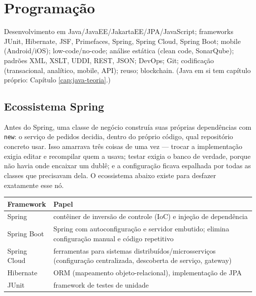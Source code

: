 \chapter{Programação}
\label{cap:programacao-teoria}

\begin{edital}
Desenvolvimento em Java/JavaEE/JakartaEE/JPA/JavaScript; frameworks JUnit,
Hibernate, JSF, Primefaces, Spring, Spring Cloud, Spring Boot; mobile
(Android/iOS); low-code/no-code; análise estática (clean code, SonarQube);
padrões XML, XSLT, UDDI, REST, JSON; DevOps; Git; codificação (transacional,
analítico, mobile, API); reuso; blockchain. (Java em si tem capítulo
próprio: Capítulo \ref{cap:java-teoria}.)
\end{edital}

\section{Ecossistema Spring}

\begin{conceito}
Antes do Spring, uma classe de negócio construía suas próprias
dependências com \texttt{new}: o serviço de pedidos decidia, dentro do
próprio código, qual repositório concreto usar. Isso amarrava três coisas
de uma vez --- trocar a implementação exigia editar e recompilar quem a
usava; testar exigia o banco de verdade, porque não havia onde encaixar um
dublê; e a configuração ficava espalhada por todas as classes que
precisavam dela. O ecossistema abaixo existe para desfazer exatamente esse
nó.

\begin{center}
\begin{tabular}{@{}p{2.6cm}p{8.6cm}@{}}
\toprule
\textbf{Framework} & \textbf{Papel} \\
\midrule
Spring & contêiner de inversão de controle (IoC) e injeção de dependência \\
Spring Boot & Spring com autoconfiguração e servidor embutido; elimina
configuração manual e código repetitivo \\
Spring Cloud & ferramentas para sistemas distribuídos/microsserviços
(configuração centralizada, descoberta de serviço, gateway) \\
Hibernate & ORM (mapeamento objeto-relacional), implementação de JPA \\
JUnit & framework de testes de unidade \\
\bottomrule
\end{tabular}
\end{center}
\end{conceito}

